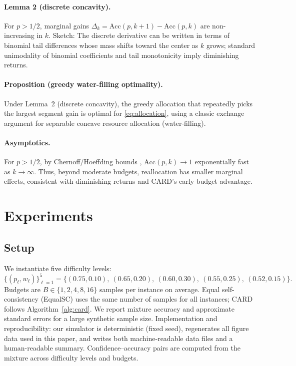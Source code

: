 \documentclass[11pt]{article}
\begin{document}
\paragraph{Lemma 2 (discrete concavity).}
For $p>1/2$, marginal gains $\Delta_k=\mathrm{Acc}(p,k{+}1)-\mathrm{Acc}(p,k)$ are non-increasing in $k$.
Sketch: The discrete derivative can be written in terms of binomial tail differences whose mass shifts toward the center as $k$ grows; standard unimodality of binomial coefficients and tail monotonicity imply diminishing returns.

\paragraph{Proposition (greedy water-filling optimality).}
Under Lemma~2 (discrete concavity), the greedy allocation that repeatedly picks the largest segment gain is optimal for \eqref{eq:allocation}, using a classic exchange argument for separable concave resource allocation (water-filling).

\paragraph{Asymptotics.}
For $p>1/2$, by Chernoff/Hoeffding bounds \citep{Hoeffding1963}, $\mathrm{Acc}(p,k)\to 1$ exponentially fast as $k\to\infty$. Thus, beyond moderate budgets, reallocation has smaller marginal effects, consistent with diminishing returns and CARD’s early-budget advantage.

\section{Experiments}
\subsection{Setup}
We instantiate five difficulty levels:
\[
\{(p_\ell,w_\ell)\}_{\ell=1}^{5} = \{(0.75,0.10),\ (0.65,0.20),\ (0.60,0.30),\ (0.55,0.25),\ (0.52,0.15)\}.
\]
Budgets are $B \in \{1,2,4,8,16\}$ samples per instance on average.
Equal self-consistency (EqualSC) uses the same number of samples for all instances; CARD follows Algorithm~\ref{alg:card}.
We report mixture accuracy and approximate standard errors for a large synthetic sample size.
Implementation and reproducibility: our simulator is deterministic (fixed seed), regenerates all figure data used in this paper, and writes both machine-readable data files and a human-readable summary. Confidence–accuracy pairs are computed from the mixture across difficulty levels and budgets.
\end{document}
